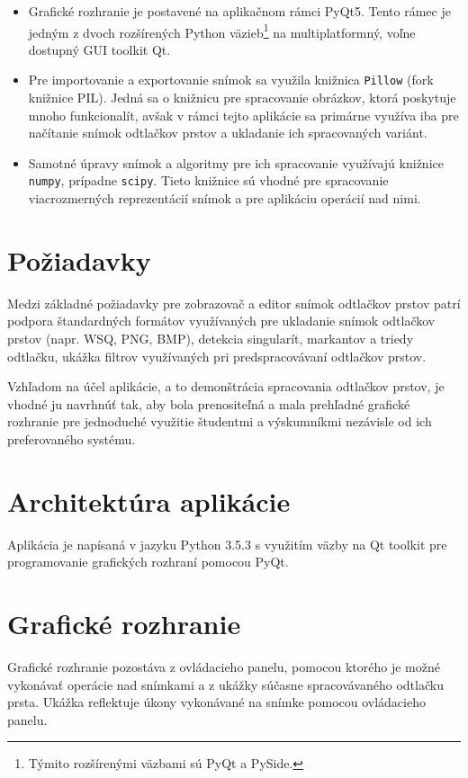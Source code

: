   \begin{itemize}
    \item Grafické rozhranie je postavené na aplikačnom rámci PyQt5. Tento rámec je jedným z dvoch rozšírených Python väzieb\footnote{Týmito rozšírenými
          väzbami sú PyQt a PySide.}
          na multiplatformný, voľne dostupný GUI toolkit Qt.
    \item Pre importovanie a exportovanie snímok sa využila knižnica \texttt{Pillow} (fork knižnice PIL). Jedná sa o knižnicu pre spracovanie obrázkov,
          ktorá poskytuje mnoho funkcionalít, avšak v rámci tejto aplikácie sa primárne využíva iba pre načítanie snímok odtlačkov prstov a ukladanie
          ich spracovaných variánt.
    \item Samotné úpravy snímok a algoritmy pre ich spracovanie využívajú knižnice \texttt{numpy}, prípadne \texttt{scipy}. Tieto knižnice sú vhodné pre
          spracovanie viacrozmerných reprezentácií snímok a pre aplikáciu operácií nad nimi.
  \end{itemize}

  \section{Požiadavky}
  Medzi základné požiadavky pre zobrazovač a editor snímok odtlačkov prstov patrí podpora štandardných formátov využívaných
  pre ukladanie snímok odtlačkov prstov (napr. WSQ, PNG, BMP),
  detekcia singularít, markantov a triedy odtlačku, ukážka filtrov využívaných pri predspracovávaní odtlačkov prstov.

  Vzhľadom na účel aplikácie, a to demonštrácia spracovania odtlačkov prstov, je vhodné ju navrhnúť tak, aby bola prenositeľná a mala prehľadné 
  grafické rozhranie pre jednoduché využitie študentmi a výskumníkmi nezávisle od ich preferovaného systému.

  \section{Architektúra aplikácie}
  Aplikácia je napísaná v jazyku Python 3.5.3 s využitím väzby na Qt toolkit pre programovanie grafických rozhraní pomocou PyQt.
  

  \section{Grafické rozhranie}
  Grafické rozhranie pozostáva z ovládacieho panelu, pomocou ktorého je možné vykonávať operácie nad snímkami a z ukážky súčasne
  spracovávaného odtlačku prsta. Ukážka reflektuje úkony vykonávané na snímke pomocou ovládacieho panelu.

